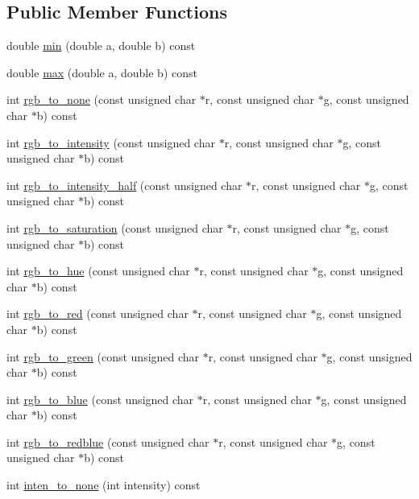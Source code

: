 \subsection*{Public Member Functions}
\begin{CompactItemize}
\item 
double \hyperlink{classextrema_1_1CPreprocess_ec7e0ba304457a257b1e531c79b06667}{min} (double a, double b) const 
\item 
double \hyperlink{classextrema_1_1CPreprocess_81fe18ae07ebd2d372821336df1ae1f5}{max} (double a, double b) const 
\item 
int \hyperlink{classextrema_1_1CPreprocess_9d696cdf40c918c33fbb55188e88c1fb}{rgb\_\-to\_\-none} (const unsigned char $\ast$r, const unsigned char $\ast$g, const unsigned char $\ast$b) const 
\item 
int \hyperlink{classextrema_1_1CPreprocess_c02257ed4a69dd5abd3fc5d6ed369c37}{rgb\_\-to\_\-intensity} (const unsigned char $\ast$r, const unsigned char $\ast$g, const unsigned char $\ast$b) const 
\item 
int \hyperlink{classextrema_1_1CPreprocess_791038e205769e2ca237b090e3ad142e}{rgb\_\-to\_\-intensity\_\-half} (const unsigned char $\ast$r, const unsigned char $\ast$g, const unsigned char $\ast$b) const 
\item 
int \hyperlink{classextrema_1_1CPreprocess_2d7383d347633cf3613057d626bc9489}{rgb\_\-to\_\-saturation} (const unsigned char $\ast$r, const unsigned char $\ast$g, const unsigned char $\ast$b) const 
\item 
int \hyperlink{classextrema_1_1CPreprocess_ba615f38b0c242f788113329ec4823ea}{rgb\_\-to\_\-hue} (const unsigned char $\ast$r, const unsigned char $\ast$g, const unsigned char $\ast$b) const 
\item 
int \hyperlink{classextrema_1_1CPreprocess_96132275c8f3491fff510235e25d9b2a}{rgb\_\-to\_\-red} (const unsigned char $\ast$r, const unsigned char $\ast$g, const unsigned char $\ast$b) const 
\item 
int \hyperlink{classextrema_1_1CPreprocess_2e6c88fd73ae9e2728e153124d6b55f0}{rgb\_\-to\_\-green} (const unsigned char $\ast$r, const unsigned char $\ast$g, const unsigned char $\ast$b) const 
\item 
int \hyperlink{classextrema_1_1CPreprocess_8e2a21dda19221e93b356c5c5ca5f671}{rgb\_\-to\_\-blue} (const unsigned char $\ast$r, const unsigned char $\ast$g, const unsigned char $\ast$b) const 
\item 
int \hyperlink{classextrema_1_1CPreprocess_845037c3f5a01296bad815c96730b50f}{rgb\_\-to\_\-redblue} (const unsigned char $\ast$r, const unsigned char $\ast$g, const unsigned char $\ast$b) const 
\item 
int \hyperlink{classextrema_1_1CPreprocess_b7634e3b764a1529cc27df75086d5d75}{inten\_\-to\_\-none} (int intensity) const 
\end{CompactItemize}


